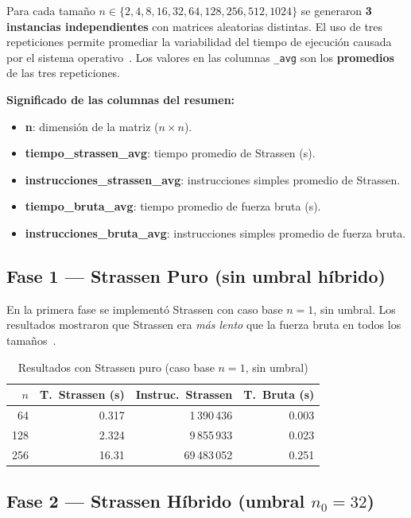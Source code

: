 \documentclass[12pt,a4paper]{article}
\begin{document}
Para cada tama\~no $n \in \{2, 4, 8, 16, 32, 64, 128, 256, 512, 1024\}$ se
generaron \textbf{3 instancias independientes} con matrices aleatorias
distintas. El uso de tres repeticiones permite promediar la variabilidad del
tiempo de ejecuci\'on causada por el sistema
operativo~\cite{skiena2020algorithm}. Los valores en las columnas
\texttt{\_avg} son los \textbf{promedios} de las tres repeticiones.

\noindent\textbf{Significado de las columnas del resumen:}
\begin{itemize}
    \item \textbf{n}: dimensi\'on de la matriz ($n \times n$).
    \item \textbf{tiempo\_strassen\_avg}: tiempo promedio de Strassen (s).
    \item \textbf{instrucciones\_strassen\_avg}: instrucciones simples promedio de Strassen.
    \item \textbf{tiempo\_bruta\_avg}: tiempo promedio de fuerza bruta (s).
    \item \textbf{instrucciones\_bruta\_avg}: instrucciones simples promedio de fuerza bruta.
\end{itemize}

\subsection{Fase 1 --- Strassen Puro (sin umbral h\'ibrido)}

En la primera fase se implement\'o Strassen con caso base $n = 1$, sin umbral.
Los resultados mostraron que Strassen era \emph{m\'as lento} que la fuerza
bruta en todos los tama\~nos~\cite{higham2002accuracy}.

\begin{table}[H]
\centering
\caption{Resultados con Strassen puro (caso base $n = 1$, sin umbral)}
\label{tab:puro}
\begin{tabular}{rrrr}
\toprule
$n$ & T.\ Strassen (s) & Instruc.\ Strassen & T.\ Bruta (s) \\
\midrule
  64 & 0.317 & 1\,390\,436  & 0.003 \\
 128 & 2.324 & 9\,855\,933  & 0.023 \\
 256 & 16.31 & 69\,483\,052 & 0.251 \\
\bottomrule
\end{tabular}
\end{table}

\subsection{Fase 2 --- Strassen H\'ibrido (umbral \texorpdfstring{$n_0 = 32$}{n0 = 32})}
\end{document}
